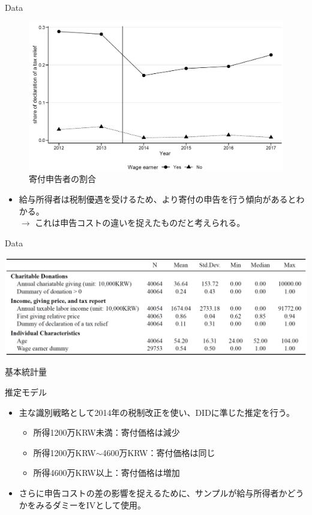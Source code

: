 \documentclass[dvipdfmx,10pt]{beamer}
\begin{document}
\begin{frame}{Data}
	\begin{figure}
		\centering
		\includegraphics[width=0.7\linewidth]{Fig_Declaration}
		\caption{寄付申告者の割合}
		\label{fig:4}
	\end{figure}
\small
	\begin{itemize}
		\item 給与所得者は税制優遇を受けるため、より寄付の申告を行う傾向があるとわかる。\\
		$\to$ これは申告コストの違いを捉えたものだと考えられる。
	\end{itemize}
\end{frame}

\begin{frame}{Data}
	\begin{table}
		\centering
		\includegraphics[width=0.9\linewidth]{Tab_Stat}
		\caption{基本統計量}
		\label{tab:1}
	\end{table}
\end{frame}

\begin{frame}{推定モデル}
\begin{itemize}
	\item 主な識別戦略として2014年の税制改正を使い、DIDに準じた推定を行う。
	\begin{itemize}
		\item 所得1200万KRW未満：寄付価格は減少
		\item 所得1200万KRW$\sim$4600万KRW：寄付価格は同じ
		\item 所得4600万KRW以上：寄付価格は増加
	\end{itemize}
	\item さらに申告コストの差の影響を捉えるために、サンプルが給与所得者かどうかをみるダミーをIVとして使用。
\end{itemize}
\end{frame}
\end{document}
